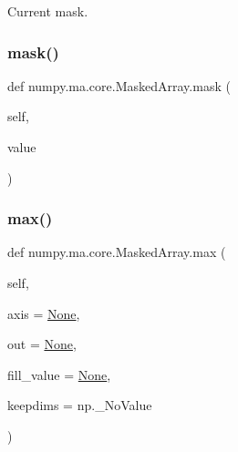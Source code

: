 \begin{DoxyVerb}Current mask. \end{DoxyVerb}
 \mbox{\label{classnumpy_1_1ma_1_1core_1_1MaskedArray_aed2a5508c132dc54a196c4b9a0cfc95d}} 
\subsubsection{\texorpdfstring{mask()}{mask()}\hspace{0.1cm}{\footnotesize\ttfamily [2/2]}}
{\footnotesize\ttfamily def numpy.\+ma.\+core.\+Masked\+Array.\+mask (\begin{DoxyParamCaption}\item[{}]{self,  }\item[{}]{value }\end{DoxyParamCaption})}

\mbox{\label{classnumpy_1_1ma_1_1core_1_1MaskedArray_ac653335e1727bac6f650f043ffd91069}} 
\subsubsection{\texorpdfstring{max()}{max()}}
{\footnotesize\ttfamily def numpy.\+ma.\+core.\+Masked\+Array.\+max (\begin{DoxyParamCaption}\item[{}]{self,  }\item[{}]{axis = {\ttfamily \hyperlink{namespacenumpy_1_1ma_1_1core_a647ee1848dfa3692fe35a663a2aa40b3}{None}},  }\item[{}]{out = {\ttfamily \hyperlink{namespacenumpy_1_1ma_1_1core_a647ee1848dfa3692fe35a663a2aa40b3}{None}},  }\item[{}]{fill\+\_\+value = {\ttfamily \hyperlink{namespacenumpy_1_1ma_1_1core_a647ee1848dfa3692fe35a663a2aa40b3}{None}},  }\item[{}]{keepdims = {\ttfamily np.\+\_\+NoValue} }\end{DoxyParamCaption})}

